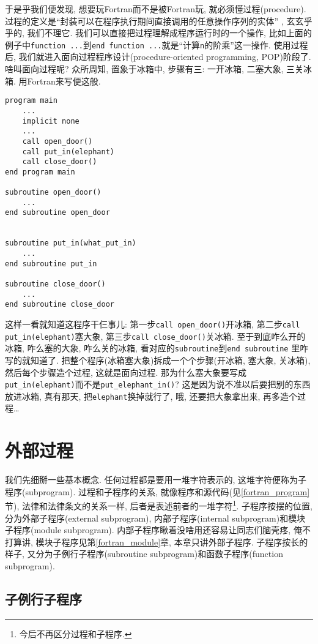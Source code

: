 于是乎我们便发现, 想要玩Fortran而不是被Fortran玩, 就必须懂过程(procedure). 过程的定义是``封装可以在程序执行期间直接调用的任意操作序列的实体'' , 玄玄乎乎的, 我们不理它. 我们可以直接把过程理解成程序运行时的一个操作, 比如上面的例子中\texttt{function ...}到\texttt{end function ...}就是``计算\texttt{n}的阶乘''这一操作. 使用过程后, 我们就进入面向过程程序设计(procedure-oriented programming, POP)阶段了. 啥叫面向过程呢? 众所周知, 置象于冰箱中, 步骤有三: 一开冰箱, 二塞大象, 三关冰箱. 用Fortran来写便这般.
\begin{lstlisting}
program main
    ...
    implicit none
    ...
    call open_door()
    call put_in(elephant)
    call close_door()
end program main

subroutine open_door()
    ...
end subroutine open_door


subroutine put_in(what_put_in)
    ...
end subroutine put_in

subroutine close_door()
    ...
end subroutine close_door
\end{lstlisting}
这样一看就知道这程序干仨事儿: 第一步\texttt{call open\_{}door()}开冰箱, 第二步\texttt{call put\_{}in(elephant)}塞大象, 第三步\texttt{call close\_{}door()}关冰箱. 至于到底咋么开的冰箱, 咋么塞的大象, 咋么关的冰箱, 看对应的\texttt{subroutine}到\texttt{end subroutine}
里咋写的就知道了. 把整个程序(冰箱塞大象)拆成一个个步骤(开冰箱, 塞大象, 关冰箱), 然后每个步骤造个过程, 这就是面向过程. 那为什么塞大象要写成\texttt{put\_{}in(elephant)}而不是\texttt{put\_{}elephant\_{}in()}? 这是因为说不准以后要把别的东西放进冰箱, 真有那天, 把\texttt{elephant}换掉就行了, 哦, 还要把大象拿出来, 再多造个过程\dots

\section{外部过程}

我们先细掰一些基本概念. 任何过程都是要用一堆字符表示的, 这堆字符便称为子程序(subprogram). 过程和子程序的关系, 就像程序和源代码(见\ref{fortran_program}节), 法律和法律条文的关系一样, 后者是表述前者的一堆字符\footnote{今后不再区分过程和子程序.}. 子程序按摆的位置, 分为外部子程序(external subprogram), 内部子程序(internal subprogram)和模块子程序(module subprogram). 内部子程序瞅着没啥用还容易让同志们脑壳疼, 俺不打算讲, 模块子程序见第\ref{fortran_module}章, 本章只讲外部子程序. 子程序按长的样子, 又分为子例行子程序(subroutine subprogram)和函数子程序(function subprogram).

\subsection{子例行子程序}

